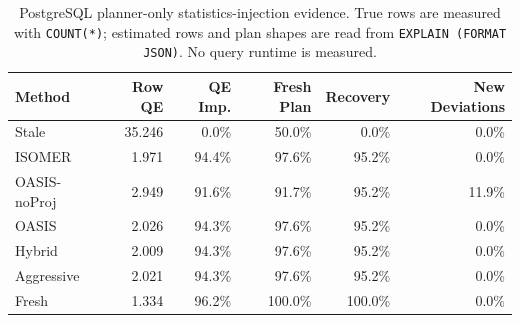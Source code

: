 \begin{table}[t]
  \centering
  \small
  \caption{PostgreSQL planner-only statistics-injection evidence. True rows are measured with \texttt{COUNT(*)}; estimated rows and plan shapes are read from \texttt{EXPLAIN (FORMAT JSON)}. No query runtime is measured.}
  \label{tab:postgres_planner_stats_injection}
  \setlength{\tabcolsep}{4pt}
  \begin{tabular}{lrrrrr}
    \toprule
    Method & Row QE & QE Imp. & Fresh Plan & Recovery & New Deviations \\
    \midrule
    Stale & 35.246 & 0.0\% & 50.0\% & 0.0\% & 0.0\% \\
    ISOMER & 1.971 & 94.4\% & 97.6\% & 95.2\% & 0.0\% \\
    OASIS-noProj & 2.949 & 91.6\% & 91.7\% & 95.2\% & 11.9\% \\
    OASIS & 2.026 & 94.3\% & 97.6\% & 95.2\% & 0.0\% \\
    Hybrid & 2.009 & 94.3\% & 97.6\% & 95.2\% & 0.0\% \\
    Aggressive & 2.021 & 94.3\% & 97.6\% & 95.2\% & 0.0\% \\
    Fresh & 1.334 & 96.2\% & 100.0\% & 100.0\% & 0.0\% \\
    \bottomrule
  \end{tabular}
\end{table}

